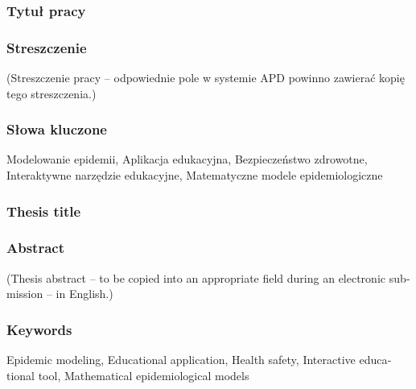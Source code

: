 \subsubsection*{Tytuł pracy} 
\Title

\subsubsection*{Streszczenie}  
(Streszczenie pracy – odpowiednie pole w systemie APD powinno zawierać kopię tego streszczenia.)

\subsubsection*{Słowa kluczone}
Modelowanie epidemii,
Aplikacja edukacyjna,
Bezpieczeństwo zdrowotne,
Interaktywne narzędzie edukacyjne,
Matematyczne modele epidemiologiczne

\subsubsection*{Thesis title} 
\begin{otherlanguage}{british}
\TitleAlt
\end{otherlanguage}

\subsubsection*{Abstract} 
\begin{otherlanguage}{british}
(Thesis abstract – to be copied into an appropriate field during an electronic submission – in English.)
\end{otherlanguage}
\subsubsection*{Keywords}  
\begin{otherlanguage}{british}
	Epidemic modeling,
	Educational application,
	Health safety,
	Interactive educational tool,
	Mathematical epidemiological models
\end{otherlanguage}

